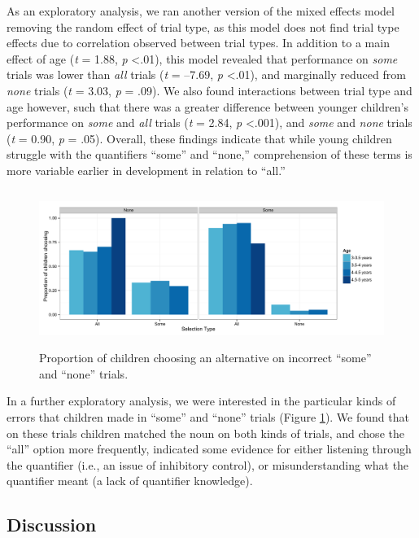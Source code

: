 \documentclass[man]{apa2}
\begin{document}
As an exploratory analysis, we ran another version of the mixed effects model removing the random effect of trial type, as this model does not find trial type effects due to correlation observed between trial types. In addition to a main effect of age (\textit{t} = 1.88, \textit{p} \textless  .01), this model revealed that performance on \textit{some} trials was lower than \textit{all} trials (\textit{t} = --7.69, \textit{p} \textless  .01), and marginally reduced from \textit{none} trials (\textit{t} = 3.03, \textit{p} = .09). We also found interactions between trial type and age however, such that there was a greater difference between younger children's performance on \textit{some} and \textit{all} trials (\textit{t} = 2.84, \textit{p} \textless  .001), and \textit{some} and \textit{none} trials (\textit{t} = 0.90, \textit{p} = .05). Overall, these findings indicate that while young children struggle with the quantifiers ``some'' and ``none,'' comprehension of these terms is more variable earlier in development in relation to ``all.'' 

\begin{figure} 
 \begin{center} 
  \includegraphics[height=2in]{figures/exp2_wrong.pdf} 
  \caption{\label{fig:exp2_wrong} Proportion of children choosing an alternative on incorrect ``some'' and ``none'' trials.} 
 \end{center} 
\end{figure}

In a further exploratory analysis, we were interested in the particular kinds of errors that children made in ``some'' and ``none'' trials (Figure \ref{fig:exp2_wrong}). We found that on these trials children matched the noun on both kinds of trials, and chose the ``all'' option more frequently, indicated some evidence for either listening through the quantifier (i.e., an issue of inhibitory control), or misunderstanding what the quantifier meant (a lack of quantifier knowledge). 


\subsection{Discussion}
\end{document}
